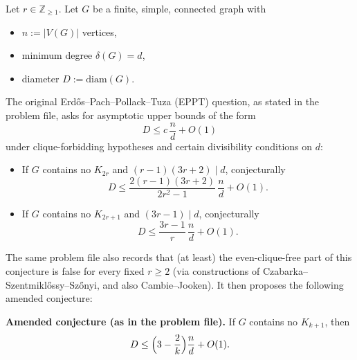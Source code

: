 Let $r\in\mathbb{Z}_{\ge 1}$. Let $G$ be a finite, simple, connected graph with
\begin{itemize}
\item $n:=|V(G)|$ vertices,
\item minimum degree $\delta(G)=d$,
\item diameter $D:=\mathrm{diam}(G)$.
\end{itemize}
The original Erd\H{o}s--Pach--Pollack--Tuza (EPPT) question, as stated in the
problem file, asks for asymptotic upper bounds of the form
\[
D \le c\,\frac{n}{d} + O(1)
\]
under clique-forbidding hypotheses and certain divisibility conditions on $d$:
\begin{itemize}
\item If $G$ contains no $K_{2r}$ and $(r-1)(3r+2)\mid d$, conjecturally
\[
D \le \frac{2(r-1)(3r+2)}{2r^2-1}\,\frac{n}{d}+O(1).
\]
\item If $G$ contains no $K_{2r+1}$ and $(3r-1)\mid d$, conjecturally
\[
D \le \frac{3r-1}{r}\,\frac{n}{d}+O(1).
\]
\end{itemize}
The same problem file also records that (at least) the even-clique-free part of
this conjecture is false for every fixed $r\ge 2$ (via constructions of
Czabarka--Szentmikl\H{o}ssy--Sz\H{o}nyi, and also Cambie--Jooken).
It then proposes the following amended conjecture:

\medskip
\noindent\textbf{Amended conjecture (as in the problem file).}
If $G$ contains no $K_{k+1}$, then
\[
D \le \Bigl(3-\frac{2}{k}\Bigr)\frac{n}{d} + O(1).
\]
